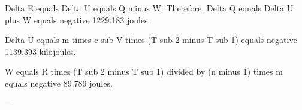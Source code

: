 Delta E equals Delta U equals Q minus W.  
Therefore, Delta Q equals Delta U plus W equals negative 1229.183 joules.  

Delta U equals m times c sub V times (T sub 2 minus T sub 1) equals negative 1139.393 kilojoules.  

W equals R times (T sub 2 minus T sub 1) divided by (n minus 1) times m equals negative 89.789 joules.  

---